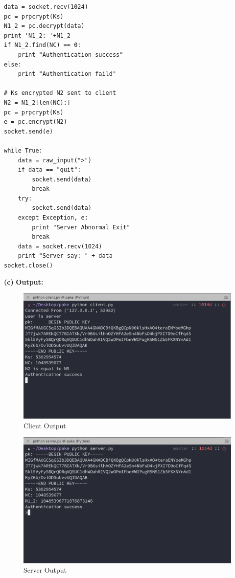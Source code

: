 \documentclass[11pt]{article}
\renewcommand\part[1]{\vspace{.10in}\textbf{(#1)}}
\newcommand\correctness{\vspace{.10in}\textbf{Output: }}
\begin{document}
\begin{lstlisting}
data = socket.recv(1024)
pc = prpcrypt(Ks)
N1_2 = pc.decrypt(data)
print 'N1_2: '+N1_2
if N1_2.find(NC) == 0:
    print "Authentication success"
else:
    print "Authentication faild"

# Ks encrypted N2 sent to client
N2 = N1_2[len(NC):]
pc = prpcrypt(Ks)
e = pc.encrypt(N2)
socket.send(e)

while True:
    data = raw_input(">")
    if data == "quit":
        socket.send(data)
        break
    try:
        socket.send(data)
    except Exception, e:
        print "Server Abnormal Exit"
        break
    data = socket.recv(1024)
    print "Server say: " + data
socket.close()
\end{lstlisting}



\part{c} \correctness
\begin{figure}[H]
    \centering
    \includegraphics[width=1\textwidth]{client}
    \caption{Client Output}
\end{figure}

\begin{figure}[H]
    \centering
    \includegraphics[width=1\textwidth]{server}
    \caption{Server Output}
\end{figure}
\end{document}
